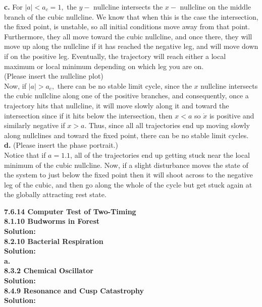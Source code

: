 \documentclass[12pt]{article}
\begin{document}
\indent
{\bf c. } For $|a|<a_c=1,$ the $y-$ nullcline intersects the $x-$ nullcline on the middle branch of the cubic nullcline. We know that when this is the case the intersection, the fixed point, is unstable, so all initial conditions move away from that point. Furthermore, they all move toward the cubic nullcline, and once there, they will move up along the nullcline if it has reached the negative leg, and will move down if on the positive leg. Eventually, the trajectory will reach either a local maximum or local minimum depending on which leg you are on.\\
(Please insert the nullcline plot)\\
Now, if $|a|>a_c,$ there can be no stable limit cycle, since the $x$ nullcline intersects the cubic nullcline along one of the positive branches, and consequently, once a trajectory hits that nullcline, it will move slowly along it and toward the intersection since if it hits below the intersection, then $x<a$ so $\dot{x}$ is positive and similarly negative if $x>a.$ Thus, since all all trajectories end up moving slowly along nullclines and toward the fixed point, there can be no stable limit cycles.\\
\indent
{\bf d. } (Please insert the phase portrait.)\\
Notice that if $a=1.1$, all of the trajectories end up getting stuck near the local minimum of the cubic nullcline. Now, if a slight disturbance moves the state of the system to just below the fixed point then it will shoot across to the negative leg of the cubic, and then go along the whole of the cycle but get stuck again at the globally attracting rest state.\\

\pagebreak

\noindent
{\bf 7.6.14 Computer Test of Two-Timing}\\

\noindent
{\bf 8.1.10 Budworms in Forest}\\
{\bf Solution:}\\

\bigskip\noindent
{\bf 8.2.10 Bacterial Respiration} \\
{\bf Solution:} \\
{\bf a. }\\
{\bf 8.3.2 Chemical Oscillator}\\
{\bf Solution:}\\

\bigskip\noindent
{\bf 8.4.9 Resonance and Cusp Catastrophy} \\
{\bf Solution:} \\
\end{document}
